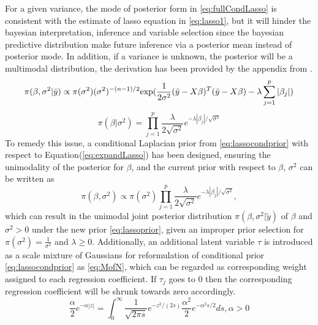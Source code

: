 For a given variance, the mode of  posterior form in \autoref{eq:fullCondLasso} is consistent with the estimate of lasso equation in \autoref{eq:lasso1}, but it will hinder the bayesian interpretation, inference and variable selection since the bayesian predictive distribution make future inference via a posterior mean instead of posterior mode.
In addition, if a variance is unknown, the posterior will be a multimodal distribution, the derivation has been provided by the appendix from \cite{park_casella_2008}.
\begin{equation}
	\label{eq:fullCondLasso}
	\pi(\beta,\sigma^2|\tilde{y}) \propto \pi(\sigma^2)(\sigma^2)^{-(n-1)/2}\textnormal{exp}(\frac{1}{2\sigma^2}(\tilde{y}-X\beta)^T(\tilde{y}-X\beta)-\lambda\sum_{j=1}^p|\beta_j|)
\end{equation}
\begin{equation}
	\label{eq:lassocondprior}
	\pi(\beta |\sigma^2) = \prod_{j=1}^p \frac{\lambda}{2\sqrt{\sigma^2}} e^{-\lambda|\beta_j|/\sqrt{\sigma^2}}
\end{equation}
To remedy this issue, a conditional Laplacian prior from \ref{eq:lassocondprior} with respect to Equation(\ref{eq:expandLasso}) has been designed, ensuring the unimodality of the posterior for $\beta$, and the current prior with respect to $\beta$, $\sigma^2$  can be written as
\begin{equation}
	\label{eq:lassoprior}
	\pi(\beta,\sigma^2) \propto \pi(\sigma^2) \prod_{j=1}^p \frac{\lambda}{2\sqrt{\sigma^2}} e^{-\lambda|\beta_j|/\sqrt{\sigma^2}},
\end{equation}
which can result in the unimodal joint posterior distribution $\pi(\beta,\sigma^2|\tilde{y})$ of $\beta$ and $\sigma^2 > 0$ under the new prior \ref{eq:lassoprior}, given an improper prior selection for $\pi(\sigma^2) = \frac{1}{\sigma^2}$ and $\lambda \geq 0$.
Additionally, an additional latent variable $\tau$ is introduced as a scale mixture of Gaussians for reformulation of conditional prior \ref{eq:lassocondprior} as \ref{eq:MofN}, which can be regarded as corresponding weight assigned to each regression coefficient. If $\tau_j$ goes to 0 then the corresponding regression coefficient will be shrunk towards zero accordingly.
\begin{equation}
	\label{eq:MofN}
	\frac{\alpha}{2}e^{-\alpha|z|} = \int_{0}^{\infty} \frac{1}{\sqrt{2\pi s}}e^{-z^2/(2s)} \frac{\alpha^2}{2}e^{-\alpha^2s/2}ds, \alpha > 0
\end{equation}

